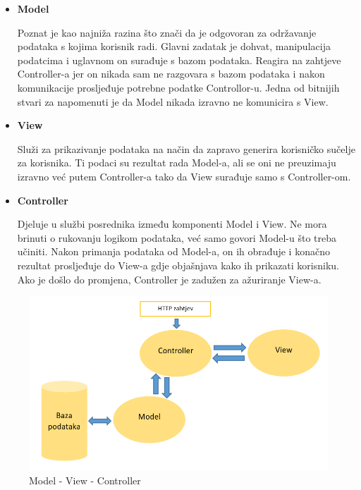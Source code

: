 		\vspace{5mm} %

		\begin{itemize}
		\item \textbf{Model}	
		
		Poznat je kao najniža razina što znači da je odgovoran za održavanje podataka s kojima korisnik radi. Glavni zadatak je dohvat, manipulacija podatcima i uglavnom on surađuje s bazom podataka. Reagira na zahtjeve Controller-a jer on nikada sam ne razgovara s bazom podataka i nakon komunikacije prosljeđuje potrebne podatke Controllor-u. Jedna od bitnijih stvari za napomenuti je da Model nikada izravno ne komunicira s View.

		\item \textbf{View}
		
		Služi za prikazivanje podataka na način da zapravo generira korisničko sučelje za korisnika. Ti podaci su rezultat rada Model-a, ali se oni ne preuzimaju izravno već putem Controller-a tako da View surađuje samo s Controller-om. 

		\item \textbf{Controller}

		Djeluje u službi posrednika između komponenti Model i View. Ne mora brinuti o rukovanju logikom podataka, već samo govori Model-u što treba učiniti. Nakon primanja podataka od Model-a, on ih obrađuje i konačno rezultat prosljeđuje do View-a gdje objašnjava kako ih prikazati korisniku. Ako je došlo do promjena, Controller je zadužen za ažuriranje View-a.


		\end{itemize}


		\begin{figure}[H]
					\includegraphics[scale=0.8]{arhitektura/mvc.png} %
					\centering
					\caption{Model - View - Controller}
					\label{fig:arhitektura}
		\end{figure}

